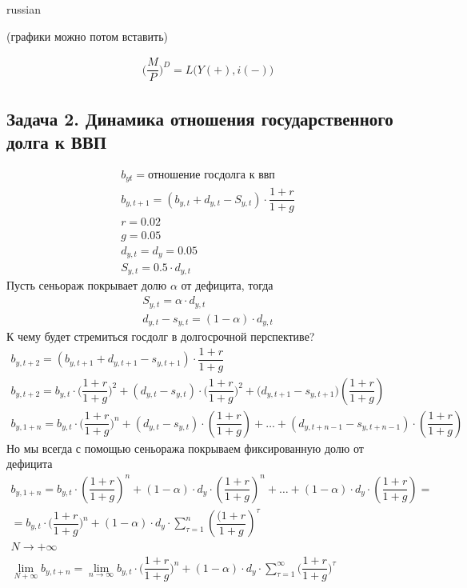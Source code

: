 \documentclass{article}
\begin{document}
\begin{otherlanguage*}{russian}
\begin{enumerate}
(графики можно потом вставить)

\begin{align*}
\Big( \dfrac{M}{P}\Big)^D = L\Big(Y (+), i (-)\Big)
\end{align*} 
\subsection*{Задача 2. Динамика отношения государственного долга к ВВП}
\begin{align*}
b_{yt} = \text{отношение госдолга к ввп } \\
b_{y, t+1} = (b_{y, t} + d_{y, t} - S_{y, t}) \cdot \dfrac{1 + r}{1 + g} \\
r = 0.02 \\
g = 0.05  \\
d_{y, t} = d_{y} = 0.05  \\
S_{y, t} = 0.5 \cdot d_{y, t} 
\end{align*}
Пусть сеньораж покрывает долю $ \alpha $  от дефицита, тогда 
\begin{align*}
S_{y, t} = \alpha \cdot d_{y,t} \\
d_{y, t} - s_{y, t} = (1 - \alpha) \cdot d_{y, t} 
\end{align*}
К чему будет стремиться госдолг в долгосрочной перспективе? 
\begin{align*}
b_{y, t+ 2} = ( b_{y, t+1} + d_{y, t+1} - s_{y, t+1}) \cdot \dfrac{1 + r}{1 + g} \\
b_{y, t+2} = b_{y, t} \cdot \Big( \dfrac{1 + r}{1 + g} \Big)^2 + (d_{y, t} - s_{y, t}) \cdot \Big( \dfrac{1 + r}{1 + g} \Big)^2  + (d_{y, t+1} - s_{y, t+1} \Big) (\dfrac{1 + r}{1 + g}) \\
b_{y, 1 + n} = b_{y, t} \cdot \Big( \dfrac{1 + r}{1 + g}\Big)^n + (d_{y, t} - s_{y, t}) \cdot (\dfrac{1 + r}{1 + g}) + \ldots + (d_{y, t+ n- 1} - s_{y, t + n - 1}) \cdot (\dfrac{1 + r}{1 + g})
\end{align*}
Но мы всегда с помощью сеньоража покрываем фиксированную долю от дефицита 
\begin{align*}
b_{y, 1 + n} = b_{y, t} \cdot ( \dfrac{1 + r}{1 + g})^n + (1 - \alpha) \cdot d_y \cdot (\dfrac{1 + r}{1 + g})^n + \ldots + (1 - \alpha) \cdot d_y \cdot (\dfrac{1 + r}{1 + g}) = \\
=  b_{y, t} \cdot \Big( \dfrac{1 + r}{1 + g} \Big)^n  + (1 - \alpha) \cdot d_y \cdot \sum_{\tau = 1}^n (\dfrac{(1 + r}{1 + g})^\tau \\
N \rightarrow + \infty \\
\lim_{N + \infty} b_{y, t + n}  = \lim_{n \rightarrow \infty} b_{y, t} \cdot \Big( \dfrac{1 + r}{1 + g} \Big)^n + (1 - \alpha) \cdot d_y \cdot \sum_{\tau = 1}^\infty \Big( \dfrac{1 + r}{1 + g} \Big) ^ \tau 

\end{align*}
\end{enumerate}
\end{otherlanguage*}
\end{document}
